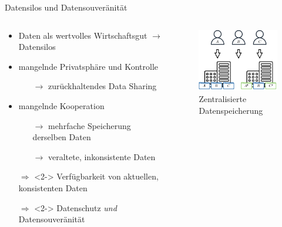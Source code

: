 \begin{frame}{Datensilos und Datensouveränität}
    \begin{columns}
        \begin{column}{0.65\textwidth}
            \begin{itemize}
                \item Daten als wertvolles Wirtschaftsgut $\to$ Datensilos
                \item mangelnde Privatsphäre und Kontrolle
                \begin{itemize}
                    \item[$\to$] zurückhaltendes Data Sharing
                \end{itemize}
                \item mangelnde Kooperation
                \begin{itemize}
                    \item[$\to$] mehrfache Speicherung derselben Daten
                    \item[$\to$] veraltete, inkonsistente Daten
                \end{itemize}
        
                \item[$\Rightarrow$]<2-> Verfügbarkeit von aktuellen, konsistenten Daten
                \item[$\Rightarrow$]<2-> Datenschutz \emph{und} Datensouveränität
            \end{itemize}
        \end{column}

        \begin{column}{0.35\textwidth}
            \vspace{2em}
            \begin{figure}
                \includegraphics[width=\textwidth]{./assets/central.drawio.pdf}
                \caption{Zentralisierte Datenspeicherung}
            \end{figure}
        \end{column}
    \end{columns}
\end{frame}
